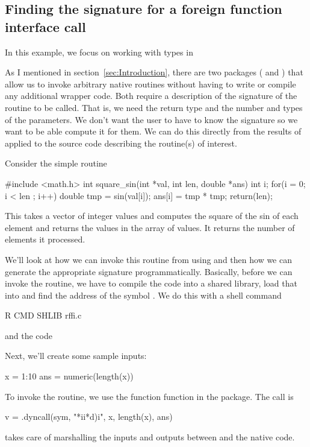 \subsection{Finding the signature for a foreign function interface call}\label{sec:RffiEG}

In this example, we focus on working with types in 

As I mentioned in section~\ref{sec:Introduction}, there are two
packages ( and ) that allow us to invoke
arbitrary native routines without having to write or compile any
additional wrapper code.  Both require a description of the signature
of the routine to be called. That is, we need the return type and the
number and types of the parameters.  We don't want the user to have to
know the signature so we want to be able compute it for them.
We can do this directly from the results of 
 applied to the source code describing the
routine(s) of interest.

Consider the simple  routine
\begin{CCode}
#include <math.h>
int
square_sin(int *val, int len, double *ans)
{
    int i;
    for(i = 0; i < len ; i++) {
	double tmp = sin(val[i]);
	ans[i] = tmp * tmp;
    }
    return(len);
}
\end{CCode}
This takes a vector of integer values and computes the
square of the sin of each element and returns the values
in the array of  values. It returns the number
of elements it processed.

We'll look at how we can invoke this routine from using
 and then how we can generate the appropriate signature
programmatically.  Basically, before we can invoke the routine, we
have to compile the \C{} code into a shared
library, load that into \R{} and find the address of the symbol
.  We do this with a shell command
\begin{ShCode}
R CMD SHLIB rffi.c
\end{ShCode}
and the \R{} code

Next, we'll create some sample inputs:
\begin{RCode}
x = 1:10
ans = numeric(length(x))
\end{RCode}

To invoke the routine, we use the function  function
in the  package. 
The call is 
\begin{RCode}
v = .dyncall(sym, "*ii*d)i", x, length(x), ans)
\end{RCode}
 takes care of marshalling the inputs and outputs
between \R{} and the native code.

